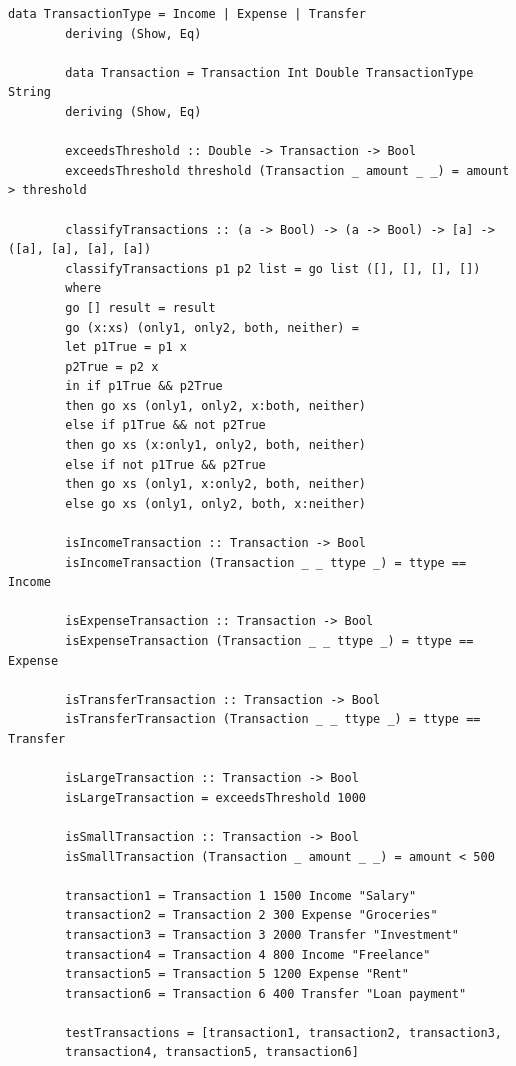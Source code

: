\documentclass[a4paper, final]{article}
\begin{document}
	\begin{lstlisting}[caption={Полный исходный код программы}]
		data TransactionType = Income | Expense | Transfer
		deriving (Show, Eq)
		
		data Transaction = Transaction Int Double TransactionType String
		deriving (Show, Eq)
		
		exceedsThreshold :: Double -> Transaction -> Bool
		exceedsThreshold threshold (Transaction _ amount _ _) = amount > threshold
		
		classifyTransactions :: (a -> Bool) -> (a -> Bool) -> [a] -> ([a], [a], [a], [a])
		classifyTransactions p1 p2 list = go list ([], [], [], [])
		where
		go [] result = result
		go (x:xs) (only1, only2, both, neither) =
		let p1True = p1 x
		p2True = p2 x
		in if p1True && p2True
		then go xs (only1, only2, x:both, neither)
		else if p1True && not p2True
		then go xs (x:only1, only2, both, neither)
		else if not p1True && p2True
		then go xs (only1, x:only2, both, neither)
		else go xs (only1, only2, both, x:neither)
		
		isIncomeTransaction :: Transaction -> Bool
		isIncomeTransaction (Transaction _ _ ttype _) = ttype == Income
		
		isExpenseTransaction :: Transaction -> Bool
		isExpenseTransaction (Transaction _ _ ttype _) = ttype == Expense
		
		isTransferTransaction :: Transaction -> Bool
		isTransferTransaction (Transaction _ _ ttype _) = ttype == Transfer
		
		isLargeTransaction :: Transaction -> Bool
		isLargeTransaction = exceedsThreshold 1000
		
		isSmallTransaction :: Transaction -> Bool
		isSmallTransaction (Transaction _ amount _ _) = amount < 500

		transaction1 = Transaction 1 1500 Income "Salary"
		transaction2 = Transaction 2 300 Expense "Groceries"
		transaction3 = Transaction 3 2000 Transfer "Investment"
		transaction4 = Transaction 4 800 Income "Freelance"
		transaction5 = Transaction 5 1200 Expense "Rent"
		transaction6 = Transaction 6 400 Transfer "Loan payment"
		
		testTransactions = [transaction1, transaction2, transaction3, 
		transaction4, transaction5, transaction6]
	\end{lstlisting}
	
\end{document}
